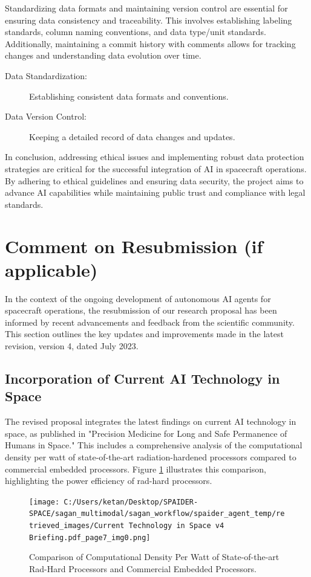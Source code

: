 \documentclass[a4paper, 11pt]{article}
\begin{document}
Standardizing data formats and maintaining version control are essential for ensuring data consistency and traceability. This involves establishing labeling standards, column naming conventions, and data type/unit standards. Additionally, maintaining a commit history with comments allows for tracking changes and understanding data evolution over time.

\begin{description}
    \item[Data Standardization:] Establishing consistent data formats and conventions.
    \item[Data Version Control:] Keeping a detailed record of data changes and updates.
\end{description}

In conclusion, addressing ethical issues and implementing robust data protection strategies are critical for the successful integration of AI in spacecraft operations. By adhering to ethical guidelines and ensuring data security, the project aims to advance AI capabilities while maintaining public trust and compliance with legal standards.
\section{Comment on Resubmission (if applicable)}

In the context of the ongoing development of autonomous AI agents for spacecraft operations, the resubmission of our research proposal has been informed by recent advancements and feedback from the scientific community. This section outlines the key updates and improvements made in the latest revision, version 4, dated July 2023.

\subsection{Incorporation of Current AI Technology in Space}

The revised proposal integrates the latest findings on current AI technology in space, as published in "Precision Medicine for Long and Safe Permanence of Humans in Space." This includes a comprehensive analysis of the computational density per watt of state-of-the-art radiation-hardened processors compared to commercial embedded processors. Figure \ref{fig:comp_density} illustrates this comparison, highlighting the power efficiency of rad-hard processors.

\begin{figure}[htbp]
    \centering
    \texttt{[image: C:/Users/ketan/Desktop/SPAIDER-SPACE/sagan\_multimodal/sagan\_workflow/spaider\_agent\_temp/retrieved\_images/Current Technology in Space v4 Briefing.pdf\_page7\_img0.png]}
    \caption{Comparison of Computational Density Per Watt of State-of-the-art Rad-Hard Processors and Commercial Embedded Processors.}
    \label{fig:comp_density}
\end{figure}
\end{document}
